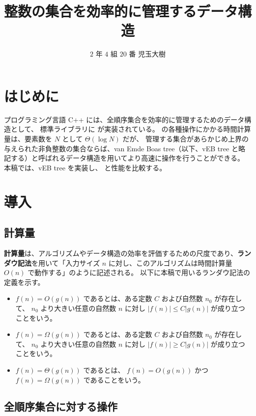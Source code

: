 \documentclass[dvipdfmx,a4j,10pt]{jarticle}
\begin{document}
\title{整数の集合を効率的に管理するデータ構造}
\author{$2$ 年 $4$ 組 $20$ 番 児玉大樹}
\date{}
\maketitle

\section{はじめに}

プログラミング言語 C++ には、全順序集合を効率的に管理するためのデータ構造として、
標準ライブラリに  が実装されている。
 の各種操作にかかる時間計算量は、要素数を $N$ として $\Theta (\log N)$ だが、
管理する集合があらかじめ上界の与えられた非負整数の集合ならば、van Emde Boas tree（以下、vEB tree と略記する）と呼ばれるデータ構造を用いてより高速に操作を行うことができる。
本稿では、vEB tree を実装し、 と性能を比較する。

\section{導入}

\subsection{計算量}

\textbf{計算量}は、アルゴリズムやデータ構造の効率を評価するための尺度であり、\textbf{ランダウ記法}を用いて「入力サイズ $n$ に対し、このアルゴリズムは時間計算量 $O(n)$ で動作する」のように記述される。
以下に本稿で用いるランダウ記法の定義を示す。

\begin{itemize}
  \item 
    $f(n) = O(g(n))$ であるとは、ある定数 $C$ および自然数 $n_0$ が存在して、
    $n_0$ より大きい任意の自然数 $n$ に対し $|f(n)| \leq C|g(n)|$ が成り立つことをいう。
  \item 
    $f(n) = \Omega(g(n))$ であるとは、ある定数 $C$ および自然数 $n_0$ が存在して、
    $n_0$ より大きい任意の自然数 $n$ に対し $|f(n)| \geq C|g(n)|$ が成り立つことをいう。
  \item 
    $f(n) = \Theta(g(n))$ であるとは、
    $f(n) = O(g(n))$ かつ $f(n) = \Omega(g(n))$ であることをいう。
\end{itemize}

\subsection{全順序集合に対する操作}
\end{document}
